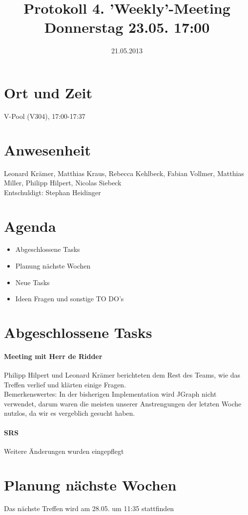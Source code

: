 \documentclass{scrartcl}
\date{21.05.2013}
\title{Protokoll 4. 'Weekly'-Meeting Donnerstag 23.05. 17:00}
\begin{document}
\maketitle
\section{Ort und Zeit}
V-Pool (V304), 17:00-17:37 \\
\section{Anwesenheit}
Leonard Krämer, Matthias Kraus, Rebecca Kehlbeck, Fabian Vollmer, Matthias Miller, Philipp Hilpert, Nicolas Siebeck \\ Entschuldigt: Stephan Heidinger
\section{Agenda}
\begin{itemize}
\item Abgeschlossene Tasks
\item Planung nächste Wochen
\item Neue Tasks
\item Ideen Fragen und sonstige TO DO's
\end{itemize}

\section{Abgeschlossene Tasks}
\paragraph{Meeting mit Herr de Ridder}
Philipp Hilpert und Leonard Krämer berichteten dem Rest des Teams, wie das Treffen verlief und klärten einige Fragen. \\
Bemerkenswertes: In der bisherigen Implementation wird JGraph nicht verwendet, darum waren die meisten unserer Anstrengungen der letzten Woche nutzlos, da wir es vergeblich gesucht haben.
\paragraph{SRS} Weitere Änderungen wurden eingepflegt
\section{ Planung nächste Wochen}
Das nächste Treffen wird am 28.05. um 11:35 stattfinden
\end{document}
